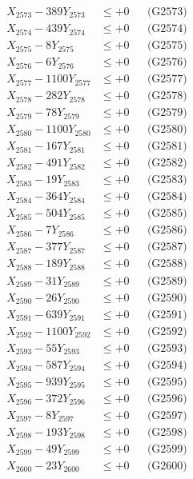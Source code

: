 \documentclass[a4paper,10pt]{article}
\begin{document}
{\begin{align}
X_{2573} - 389Y_{2573} &\leq +0 && \text{(G2573)} \\
X_{2574} - 439Y_{2574} &\leq +0 && \text{(G2574)} \\
X_{2575} - 8Y_{2575} &\leq +0 && \text{(G2575)} \\
X_{2576} - 6Y_{2576} &\leq +0 && \text{(G2576)} \\
X_{2577} - 1100Y_{2577} &\leq +0 && \text{(G2577)} \\
X_{2578} - 282Y_{2578} &\leq +0 && \text{(G2578)} \\
X_{2579} - 78Y_{2579} &\leq +0 && \text{(G2579)} \\
X_{2580} - 1100Y_{2580} &\leq +0 && \text{(G2580)} \\
\allowbreak
X_{2581} - 167Y_{2581} &\leq +0 && \text{(G2581)} \\
X_{2582} - 491Y_{2582} &\leq +0 && \text{(G2582)} \\
X_{2583} - 19Y_{2583} &\leq +0 && \text{(G2583)} \\
X_{2584} - 364Y_{2584} &\leq +0 && \text{(G2584)} \\
X_{2585} - 504Y_{2585} &\leq +0 && \text{(G2585)} \\
X_{2586} - 7Y_{2586} &\leq +0 && \text{(G2586)} \\
X_{2587} - 377Y_{2587} &\leq +0 && \text{(G2587)} \\
X_{2588} - 189Y_{2588} &\leq +0 && \text{(G2588)} \\
X_{2589} - 31Y_{2589} &\leq +0 && \text{(G2589)} \\
X_{2590} - 26Y_{2590} &\leq +0 && \text{(G2590)} \\
\allowbreak
X_{2591} - 639Y_{2591} &\leq +0 && \text{(G2591)} \\
X_{2592} - 1100Y_{2592} &\leq +0 && \text{(G2592)} \\
X_{2593} - 55Y_{2593} &\leq +0 && \text{(G2593)} \\
X_{2594} - 587Y_{2594} &\leq +0 && \text{(G2594)} \\
X_{2595} - 939Y_{2595} &\leq +0 && \text{(G2595)} \\
X_{2596} - 372Y_{2596} &\leq +0 && \text{(G2596)} \\
X_{2597} - 8Y_{2597} &\leq +0 && \text{(G2597)} \\
X_{2598} - 193Y_{2598} &\leq +0 && \text{(G2598)} \\
X_{2599} - 49Y_{2599} &\leq +0 && \text{(G2599)} \\
X_{2600} - 23Y_{2600} &\leq +0 && \text{(G2600)} \\

\end{align}}
\end{document}
